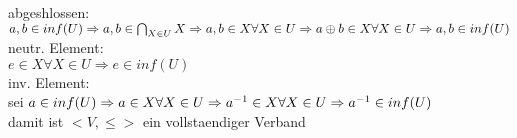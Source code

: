 \documentclass{article}
\begin{document}
abgeshlossen:\\
$
a, b \in inf(U)\\
\Rightarrow a, b \in \bigcap_{X \in U} X\\
\Rightarrow a, b \in X \forall X \in U
\Rightarrow a \oplus b \in X \forall X \in U\\
\Rightarrow a, b \in inf(U)\\
$
\\
neutr. Element:\\
$
e \in X \forall X \in U
\Rightarrow e \in inf(U)
$
\\
inv. Element:\\
sei
$
a \in inf(U)
\Rightarrow a \in X \forall X \in U
\Rightarrow a^{-1} \in X \forall X \in U\\
\Rightarrow a^{-1} \in inf(U)\\
$
\\
damit ist $<V, \leq>$ ein vollstaendiger Verband
\end{document}
